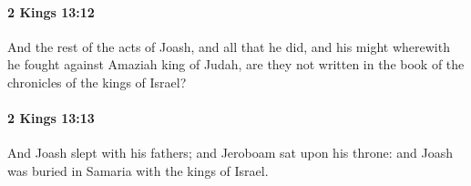 		\paragraph{2 Kings 13:12} %
			\label{2KINGS-13-12}

			And the rest of the acts of Joash, and all that he did, and his might wherewith he fought against Amaziah king of Judah, are they not written in the book of the chronicles of the kings of Israel?


		\paragraph{2 Kings 13:13} %
			\label{2KINGS-13-13}

			And Joash slept with his fathers; and Jeroboam sat upon his throne: and Joash was buried in Samaria with the kings of Israel.


